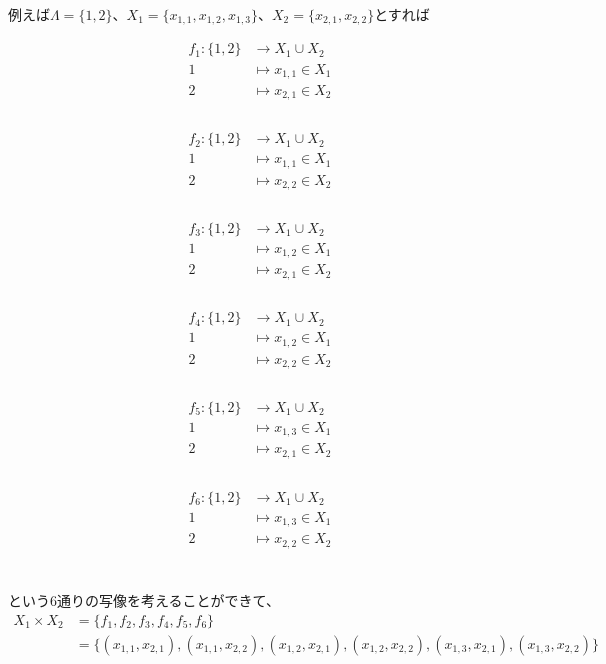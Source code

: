 \documentclass[a4j]{jsarticle}
\begin{document}
例えば$\Lambda=\{1,2\}$、$X_1=\{x_{1,1},x_{1,2},x_{1,3}\}$、$X_2=\{x_{2,1},x_{2,2}\}$とすれば
\begin{multicols}{3}
	\begin{align*}
		f_1 : \{1,2\} & \rightarrow X_1 \cup X_2 \\
		1             & \mapsto x_{1,1} \in X_1  \\
		2             & \mapsto x_{2,1}\in X_2   \\
	\end{align*}\\
	\begin{align*}
		f_2 : \{1,2\} & \rightarrow X_1 \cup X_2 \\
		1             & \mapsto x_{1,1} \in X_1  \\
		2             & \mapsto x_{2,2}\in X_2   \\
	\end{align*}\\
	\begin{align*}
		f_3 : \{1,2\} & \rightarrow X_1 \cup X_2 \\
		1             & \mapsto x_{1,2} \in X_1  \\
		2             & \mapsto x_{2,1}\in X_2   \\
	\end{align*}\\
	\begin{align*}
		f_4 : \{1,2\} & \rightarrow X_1 \cup X_2 \\
		1             & \mapsto x_{1,2} \in X_1  \\
		2             & \mapsto x_{2,2}\in X_2   \\
	\end{align*}\\
	\begin{align*}
		f_5 : \{1,2\} & \rightarrow X_1 \cup X_2 \\
		1             & \mapsto x_{1,3} \in X_1  \\
		2             & \mapsto x_{2,1}\in X_2   \\
	\end{align*}\\
	\begin{align*}
		f_6 : \{1,2\} & \rightarrow X_1 \cup X_2 \\
		1             & \mapsto x_{1,3} \in X_1  \\
		2             & \mapsto x_{2,2}\in X_2   \\
	\end{align*}\\
\end{multicols}
という6通りの写像を考えることができて、
\begin{align*}
	X_1 \times X_2 & = \{f_1,f_2,f_3,f_4,f_5,f_6\}                                                                                     \\
	               & = \{(x_{1,1},x_{2,1}),(x_{1,1},x_{2,2}),(x_{1,2},x_{2,1}),(x_{1,2},x_{2,2}),(x_{1,3},x_{2,1}),(x_{1,3},x_{2,2})\}
\end{align*}\\
\end{document}
